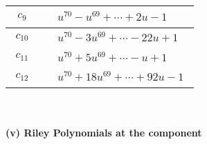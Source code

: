 \documentclass[1p]{elsarticle_modified}
\theoremstyle{definition}
\begin{document}
\begin{tabular}{m{50pt}|m{274pt}}
\hline $$\begin{aligned}c_{9}\end{aligned}$$&$\begin{aligned}
&u^{70}- u^{69}+\cdots+2 u-1
\end{aligned}$\\
\hline $$\begin{aligned}c_{10}\end{aligned}$$&$\begin{aligned}
&u^{70}-3 u^{69}+\cdots-22 u+1
\end{aligned}$\\
\hline $$\begin{aligned}c_{11}\end{aligned}$$&$\begin{aligned}
&u^{70}+5 u^{69}+\cdots- u+1
\end{aligned}$\\
\hline $$\begin{aligned}c_{12}\end{aligned}$$&$\begin{aligned}
&u^{70}+18 u^{69}+\cdots+92 u-1
\end{aligned}$\\
\hline
\end{tabular}\\~\\
\newpage\renewcommand{\arraystretch}{1}
\flushleft \textbf{(v) Riley Polynomials at the component}\newline \\
\end{document}

